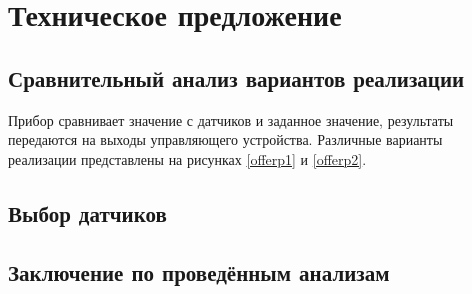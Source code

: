 \chapter{Техническое предложение}
\section{Сравнительный анализ вариантов реализации}
Прибор сравнивает значение с датчиков и заданное значение, результаты передаются на выходы управляющего устройства.
Различные варианты реализации представлены на рисунках \ref{offerp1} и \ref{offerp2}.
\section{Выбор датчиков}
\section{Заключение по проведённым анализам}
